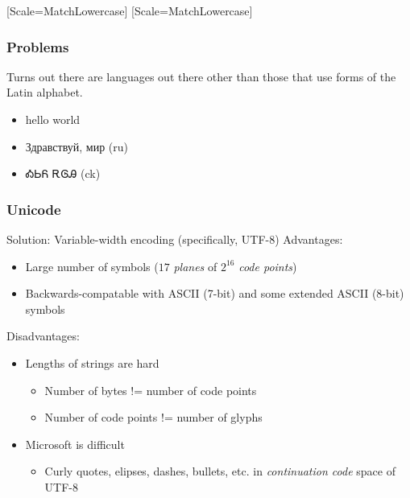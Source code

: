 \documentclass[smaller,xcolor=table,aspectratio=169]{beamer}
\begin{document}
						\newfontface{}[Scale=MatchLowercase]
						\newfontface{}[Scale=MatchLowercase]
						\newcommand{\hebtxt}[1]%
						{\bgroup\textdir TRT\hebfont #1\egroup}

						\begin{frame}
							\frametitle{Problems}
							Turns out there are languages out there other than those that use forms of the Latin alphabet.
							\begin{itemize}
								\item<1-> hello world
								\item<2-> Здравствуй, мир (ru)
								\item<3-> {\chkfont ᎣᏏᏲ ᎡᎶᎯ} (ck)
							\end{itemize}
						\end{frame}

						\begin{frame}
							\frametitle{Unicode}
							Solution:  Variable-width encoding (specifically, UTF-8)
							Advantages:
							\begin{itemize}
								\item Large number of symbols ($17$ {\em planes} of $2^{16}$ {\em code points})
								\item Backwards-compatable with ASCII (7-bit) and some extended ASCII (8-bit) symbols
							\end{itemize}
							Disadvantages:
							\begin{itemize}
								\item Lengths of strings are hard
								      \begin{itemize}
								      	\item Number of bytes != number of code points
								      	\item Number of code points != number of glyphs
								      \end{itemize}
								\item Microsoft is difficult
								      \begin{itemize}
								      	\item Curly quotes, elipses, dashes, bullets, etc. in {\em continuation code} space of UTF-8
								      \end{itemize}
							\end{itemize}
						\end{frame}
\end{document}
